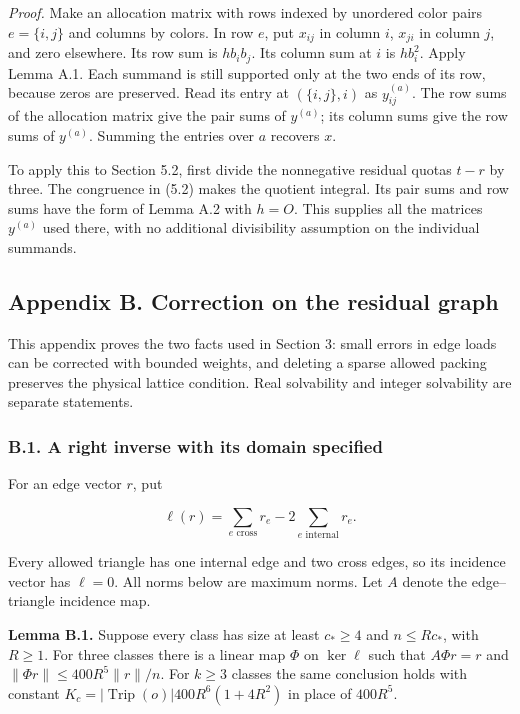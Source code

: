 \documentclass[english,11pt,a4paper]{article}
\begin{document}
\emph{Proof.} Make an allocation matrix with rows indexed by unordered color pairs \(e=\{i,j\}\) and columns by colors. In row \(e\), put \(x_{ij}\) in column \(i\), \(x_{ji}\) in column \(j\), and zero elsewhere. Its row sum is \(h b_ib_j\). Its column sum at \(i\) is \(h b_i^2\). Apply Lemma A.1. Each summand is still supported only at the two ends of its row, because zeros are preserved. Read its entry at \((\{i,j\},i)\) as \(y^{(a)}_{ij}\). The row sums of the allocation matrix give the pair sums of \(y^{(a)}\); its column sums give the row sums of \(y^{(a)}\). Summing the entries over \(a\) recovers \(x\).

To apply this to Section 5.2, first divide the nonnegative residual quotas \(t-r\) by three. The congruence in (5.2) makes the quotient integral. Its pair sums and row sums have the form of Lemma A.2 with \(h=O\). This supplies all the matrices \(y^{(a)}\) used there, with no additional divisibility assumption on the individual summands.

\subsection{Appendix B. Correction on the residual graph}\label{appendix-b.-correction-on-the-residual-graph}

This appendix proves the two facts used in Section 3: small errors in edge loads can be corrected with bounded weights, and deleting a sparse allowed packing preserves the physical lattice condition. Real solvability and integer solvability are separate statements.

\subsubsection{B.1. A right inverse with its domain specified}\label{b.1.-a-right-inverse-with-its-domain-specified}

For an edge vector \(r\), put

\[\ell(r)=\sum_{e\text{ cross}}r_e-2\sum_{e\text{ internal}}r_e.\]

Every allowed triangle has one internal edge and two cross edges, so its incidence vector has \(\ell=0\). All norms below are maximum norms. Let \(A\) denote the edge--triangle incidence map.

\textbf{Lemma B.1.} Suppose every class has size at least \(c_\ast\ge4\) and \(n\le R c_\ast\), with \(R\ge1\). For three classes there is a linear map \(\Phi\) on \(\ker\ell\) such that \(A\Phi r=r\) and \(\|\Phi r\|\le400R^5\|r\|/n\). For \(k\ge3\) classes the same conclusion holds with constant \(K_c=|\operatorname{Trip}(o)|400R^6(1+4R^2)\) in place of \(400R^5\).
\end{document}
